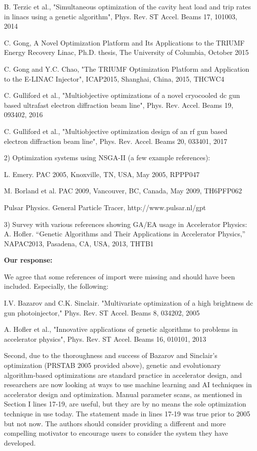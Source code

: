 \documentclass{article}
\begin{document}
B. Terzic et al., "Simultaneous optimization of the cavity heat load
and trip rates in linacs using a genetic algorithm", Phys. Rev. ST
Accel. Beams 17, 101003, 2014

C. Gong, A Novel Optimization Platform and Its Applications to the
TRIUMF Energy Recovery Linac, Ph.D. thesis, The University of
Columbia, October 2015

C. Gong and Y.C. Chao, "The TRIUMF Optimization Platform and
Application to the E-LINAC Injector", ICAP2015, Shanghai, China, 2015,
THCWC4

C. Gulliford et al., "Multiobjective optimizations of a novel
cryocooled dc gun based ultrafast electron diffraction beam line",
Phys. Rev. Accel. Beams 19, 093402, 2016

C. Gulliford et al., "Multiobjective optimization design of an rf gun
based electron diffraction beam line", Phys. Rev. Accel. Beams 20,
033401, 2017

2) Optimization systems using NSGA-II (a few example references):

L. Emery. PAC 2005, Knoxville, TN, USA, May 2005, RPPP047

M. Borland et al. PAC 2009, Vancouver, BC, Canada, May 2009, TH6PFP062

Pulsar Physics. General Particle Tracer, http://www.pulsar.nl/gpt

3) Survey with various references showing GA/EA usage in Accelerator
Physics: A. Hofler. “Genetic Algorithms and Their Applications in
Accelerator Physics,” NAPAC2013, Pasadena, CA, USA, 2013, THTB1

{\bf Our response:} {\color{blue} We agree that some references of import were missing and should have been included.
Especially, the following: 

I.V. Bazarov and C.K. Sinclair. "Multivariate optimization of a high
brightness dc gun photoinjector," Phys. Rev. ST Accel. Beams 8,
034202, 2005

A. Hofler et al., "Innovative applications of genetic algorithms to
problems in accelerator physics", Phys. Rev. ST Accel. Beams 16,
010101, 2013


}





Second, due to the thoroughness and success of Bazarov and Sinclair’s
optimization (PRSTAB 2005 provided above), genetic and evolutionary
algorithm-based optimizations are standard practice in accelerator
design, and researchers are now looking at ways to use machine
learning and AI techniques in accelerator design and optimization.
Manual parameter scans, as mentioned in Section I lines 17-19, are
useful, but they are by no means the sole optimization technique in
use today. The statement made in lines 17-19 was true prior to 2005
but not now. The authors should consider providing a different and
more compelling motivator to encourage users to consider the system
they have developed.
\end{document}
